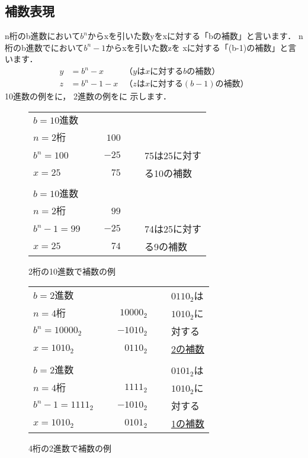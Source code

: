 \subsection{補数表現}
n桁のb進数において$b^n$からxを引いた数yをxに対する「bの補数」と言います．
n桁のb進数でにおいて$b^n-1$からxを引いた数zを
xに対する「(b-1)の補数」と言います．
{\small\begin{align*}
y&= b^n-x     &（yはxに対するbの補数） \\
z&= b^n-1-x   &（zはxに対する(b-1)の補数）
\end{align*}}
10進数の例をに，
2進数の例をに
示します．

\begin{figure}[tb]
\begin{center}
{\small\begin{tabular}{ l c r c l }
$b=10進数$    & ~ &       &   &              \\
$n=2桁$       & ~ & $100$ &   &              \\
$b^n = 100$   & ~ & $-25$ & ~ & 75は25に対す \\
\cline{3-3}
$x = 25$      &   &  $75$ &   & る10の補数   \\
              &   &       &   &        \\
$b=10進数$    & ~ &       &   &              \\
$n=2桁$       & ~ &  $99$ &   &              \\
$b^n-1 = 99$  & ~ & $-25$  & ~ & 74は25に対す \\
\cline{3-3}
$x = 25$      &   &  $74$ &   & る9の補数   \\
\end{tabular}}
\caption{2桁の10進数で補数の例}
\label{fig:chap2:sc10}
\end{center}
\end{figure}

\begin{figure}[tb]
\begin{center}
{\small\begin{tabular}{ l c r c l }
$b=2進数$       & ~ &          &   & $0110_2$は  \\ 
$n=4桁$         & ~ & $10000_2$ &   & $1010_2$に  \\
$b^n = 10000_2$ & ~ & $-1010_2$ & ~ & 対する      \\
\cline{3-3}
$x = 1010_2$    &   & $0110_2$  &   & \underline{2の補数} \\ 
                &   &           &   &            \\
$b=2進数$       & ~ &           &   & $0101_2$は \\
$n=4桁$         & ~ & $1111_2$  &   & $1010_2$に \\
$b^n-1 = 1111_2$& ~ & $-1010_2$  & ~ & 対する      \\
\cline{3-3}
$x = 1010_2$    &   & $0101_2$  &   & \underline{1の補数} \\
\end{tabular}}
\caption{4桁の2進数で補数の例}
\label{fig:chap2:sc2}
\end{center}
\end{figure}

